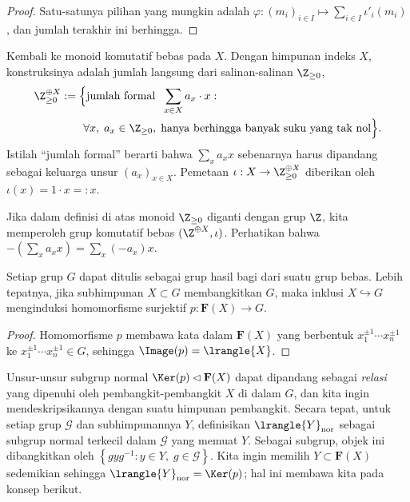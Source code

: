 \begin{proof}
	Satu-satunya pilihan yang mungkin adalah $\varphi: (m_i)_{i \in I} \mapsto \sum_{i \in I} \iota'_i(m_i)$, dan jumlah terakhir ini berhingga.
\end{proof}

Kembali ke monoid komutatif bebas pada $X$. Dengan himpunan indeks $X$, konstruksinya adalah jumlah langsung dari salinan-salinan $\Z_{\geq 0}$,
\[ \begin{aligned} \Z_{\geq 0}^{\oplus X} &:= \Bigl\{ \text{jumlah formal } \; \sum_{x \in X} a_x \cdot x : {} \\ &\qquad \forall x, \; a_x \in \Z_{\geq 0}, \; \text{hanya berhingga banyak suku yang tak nol} \Bigr\}. \end{aligned} \]
Istilah ``jumlah formal'' berarti bahwa $\sum_x a_x x$ sebenarnya harus dipandang sebagai keluarga unsur $(a_x)_{x \in X}$. Pemetaan $\iota: X \to \Z_{\geq 0}^{\oplus X}$ diberikan oleh $\iota(x) = 1 \cdot x =: x$.

Jika dalam definisi di atas monoid $\Z_{\geq 0}$ diganti dengan grup $\Z$, kita memperoleh grup komutatif bebas $(\Z^{\oplus X}, \iota)$. Perhatikan bahwa $-(\sum_x a_x x) = \sum_x (-a_x) x$.

\begin{proposition}
	Setiap grup $G$ dapat ditulis sebagai grup hasil bagi dari suatu grup bebas. Lebih tepatnya, jika subhimpunan $X \subset G$ membangkitkan $G$, maka inklusi $X \hookrightarrow G$ menginduksi homomorfisme surjektif $p: \mathbf{F}(X) \to G$.
\end{proposition}
\begin{proof}
	Homomorfisme $p$ membawa kata dalam $\mathbf{F}(X)$ yang berbentuk $x_1^{\pm 1} \cdots x_n^{\pm 1}$ ke $x_1^{\pm 1} \cdots x_n^{\pm 1} \in G$, sehingga $\Image(p) = \lrangle{X}$.
\end{proof}

Unsur-unsur subgrup normal $\Ker(p) \lhd \mathbf{F}(X)$ dapat dipandang sebagai \emph{relasi} yang dipenuhi oleh pembangkit-pembangkit $X$ di dalam $G$, dan kita ingin mendeskripsikannya dengan suatu himpunan pembangkit. Secara tepat, untuk setiap grup $\mathcal{G}$ dan subhimpunannya $Y$, definisikan $\lrangle{Y}_{\text{nor}}$ sebagai subgrup normal terkecil dalam $\mathcal{G}$ yang memuat $Y$. Sebagai subgrup, objek ini dibangkitkan oleh $\left\{ gyg^{-1}: y \in Y, \; g \in \mathcal{G} \right\}$. Kita ingin memilih $Y \subset \mathbf{F}(X)$ sedemikian sehingga $\lrangle{Y}_{\text{nor}} = \Ker(p)$; hal ini membawa kita pada konsep berikut.

